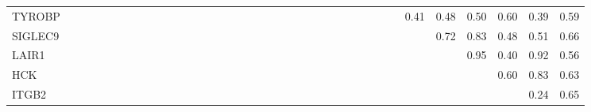 \begin{longtable}{lrrrrrrrrrrrrrrrrrrrrrrrrrrrrrrrrrrrr}
TYROBP    &            &            &              &            &              &              &                 &               &              &            &           &             &              &             &            &             &              &           &           &              &               &            &               &               &              &              &            &              &          &              &          0.41 &        0.48 &      0.50 &        0.60 &        0.39 &        0.59 \\
SIGLEC9   &            &            &              &            &              &              &                 &               &              &            &           &             &              &             &            &             &              &           &           &              &               &            &               &               &              &              &            &              &          &              &               &        0.72 &      0.83 &        0.48 &        0.51 &        0.66 \\
LAIR1     &            &            &              &            &              &              &                 &               &              &            &           &             &              &             &            &             &              &           &           &              &               &            &               &               &              &              &            &              &          &              &               &             &      0.95 &        0.40 &        0.92 &        0.56 \\
HCK       &            &            &              &            &              &              &                 &               &              &            &           &             &              &             &            &             &              &           &           &              &               &            &               &               &              &              &            &              &          &              &               &             &           &        0.60 &        0.83 &        0.63 \\
ITGB2     &            &            &              &            &              &              &                 &               &              &            &           &             &              &             &            &             &              &           &           &              &               &            &               &               &              &              &            &              &          &              &               &             &           &             &        0.24 &        0.65 \\

\end{longtable}
